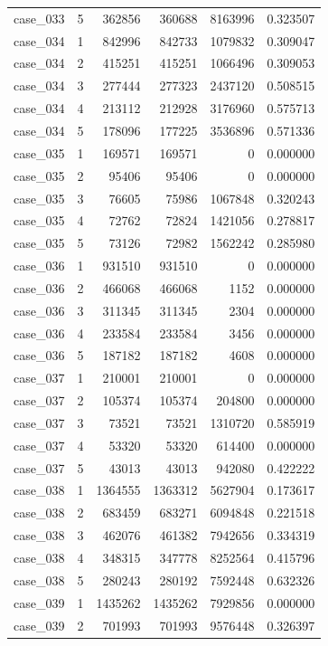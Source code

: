 \begin{longtable}{lrrrrr}
case\_033 & 5 & 362856 & 360688 & 8163996 & 0.323507 \\
case\_034 & 1 & 842996 & 842733 & 1079832 & 0.309047 \\
case\_034 & 2 & 415251 & 415251 & 1066496 & 0.309053 \\
case\_034 & 3 & 277444 & 277323 & 2437120 & 0.508515 \\
case\_034 & 4 & 213112 & 212928 & 3176960 & 0.575713 \\
case\_034 & 5 & 178096 & 177225 & 3536896 & 0.571336 \\
case\_035 & 1 & 169571 & 169571 & 0 & 0.000000 \\
case\_035 & 2 & 95406 & 95406 & 0 & 0.000000 \\
case\_035 & 3 & 76605 & 75986 & 1067848 & 0.320243 \\
case\_035 & 4 & 72762 & 72824 & 1421056 & 0.278817 \\
case\_035 & 5 & 73126 & 72982 & 1562242 & 0.285980 \\
case\_036 & 1 & 931510 & 931510 & 0 & 0.000000 \\
case\_036 & 2 & 466068 & 466068 & 1152 & 0.000000 \\
case\_036 & 3 & 311345 & 311345 & 2304 & 0.000000 \\
case\_036 & 4 & 233584 & 233584 & 3456 & 0.000000 \\
case\_036 & 5 & 187182 & 187182 & 4608 & 0.000000 \\
case\_037 & 1 & 210001 & 210001 & 0 & 0.000000 \\
case\_037 & 2 & 105374 & 105374 & 204800 & 0.000000 \\
case\_037 & 3 & 73521 & 73521 & 1310720 & 0.585919 \\
case\_037 & 4 & 53320 & 53320 & 614400 & 0.000000 \\
case\_037 & 5 & 43013 & 43013 & 942080 & 0.422222 \\
case\_038 & 1 & 1364555 & 1363312 & 5627904 & 0.173617 \\
case\_038 & 2 & 683459 & 683271 & 6094848 & 0.221518 \\
case\_038 & 3 & 462076 & 461382 & 7942656 & 0.334319 \\
case\_038 & 4 & 348315 & 347778 & 8252564 & 0.415796 \\
case\_038 & 5 & 280243 & 280192 & 7592448 & 0.632326 \\
case\_039 & 1 & 1435262 & 1435262 & 7929856 & 0.000000 \\
case\_039 & 2 & 701993 & 701993 & 9576448 & 0.326397 \\

\end{longtable}
